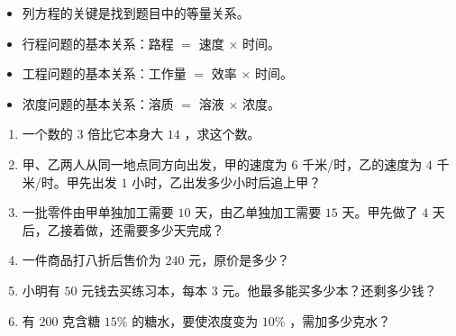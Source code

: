 \begin{keytakeaway}


\begin{itemize}
  \item 列方程的关键是找到题目中的等量关系。
  \item 行程问题的基本关系：路程 $=$ 速度 $\times$ 时间。
  \item 工程问题的基本关系：工作量 $=$ 效率 $\times$ 时间。
  \item 浓度问题的基本关系：溶质 $=$ 溶液 $\times$ 浓度。
\end{itemize}


\end{keytakeaway}

\begin{practice}


\begin{enumerate}
  \item 一个数的 $3$ 倍比它本身大 $14$ ，求这个数。
  \item 甲、乙两人从同一地点同方向出发，甲的速度为 $6$ 千米/时，乙的速度为 $4$ 千米/时。甲先出发 $1$ 小时，乙出发多少小时后追上甲？
  \item 一批零件由甲单独加工需要 $10$ 天，由乙单独加工需要 $15$ 天。甲先做了 $4$ 天后，乙接着做，还需要多少天完成？
  \item 一件商品打八折后售价为 $240$ 元，原价是多少？
  \item 小明有 $50$ 元钱去买练习本，每本 $3$ 元。他最多能买多少本？还剩多少钱？
  \item 有 $200$ 克含糖 $15\%$ 的糖水，要使浓度变为 $10\%$ ，需加多少克水？
\end{enumerate}


\end{practice}



